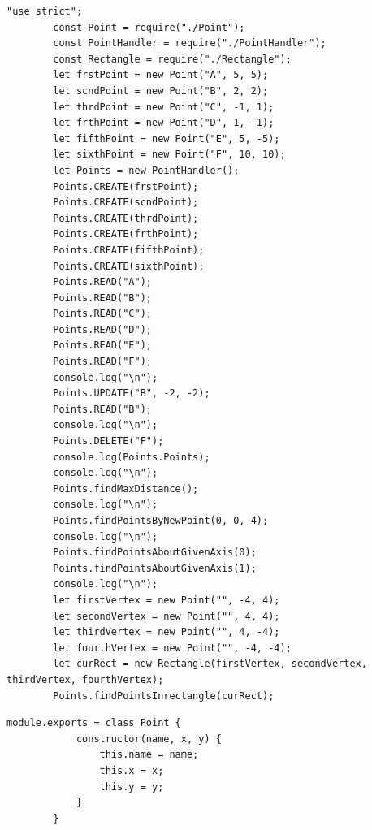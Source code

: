 \documentclass[12pt]{report}
\begin{document}
	\begin{lstlisting}[label=Task1.3,caption=Файл index.js]
		"use strict";
		const Point = require("./Point");
		const PointHandler = require("./PointHandler");
		const Rectangle = require("./Rectangle");
		let frstPoint = new Point("A", 5, 5);
		let scndPoint = new Point("B", 2, 2);
		let thrdPoint = new Point("C", -1, 1);
		let frthPoint = new Point("D", 1, -1);
		let fifthPoint = new Point("E", 5, -5);
		let sixthPoint = new Point("F", 10, 10);
		let Points = new PointHandler();
		Points.CREATE(frstPoint);
		Points.CREATE(scndPoint);
		Points.CREATE(thrdPoint);
		Points.CREATE(frthPoint);
		Points.CREATE(fifthPoint);
		Points.CREATE(sixthPoint);
		Points.READ("A");
		Points.READ("B");
		Points.READ("C");
		Points.READ("D");
		Points.READ("E");
		Points.READ("F");
		console.log("\n");
		Points.UPDATE("B", -2, -2);
		Points.READ("B");
		console.log("\n");
		Points.DELETE("F");
		console.log(Points.Points);
		console.log("\n");
		Points.findMaxDistance();
		console.log("\n");
		Points.findPointsByNewPoint(0, 0, 4);
		console.log("\n");
		Points.findPointsAboutGivenAxis(0);
		Points.findPointsAboutGivenAxis(1);
		console.log("\n");
		let firstVertex = new Point("", -4, 4);
		let secondVertex = new Point("", 4, 4);
		let thirdVertex = new Point("", 4, -4);
		let fourthVertex = new Point("", -4, -4);
		let curRect = new Rectangle(firstVertex, secondVertex, thirdVertex, fourthVertex);
		Points.findPointsInrectangle(curRect);
	\end{lstlisting}
	\begin{lstlisting}[label=Task1.3,caption=Файл Point.js]
		module.exports = class Point {
			constructor(name, x, y) {
				this.name = name;
				this.x = x;
				this.y = y;
			}
		}
	\end{lstlisting}
\end{document}
